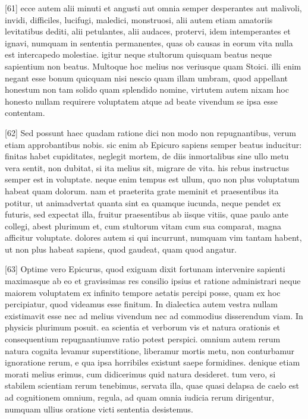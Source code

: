 \documentclass{article}
\begin{document}
[61] ecce autem alii minuti et angusti aut omnia semper desperantes aut malivoli, invidi, difficiles, lucifugi, maledici, monstruosi, alii autem etiam amatoriis levitatibus dediti, alii petulantes, alii audaces, protervi, idem intemperantes et ignavi, numquam in sententia permanentes, quas ob causas in eorum vita nulla est intercapedo molestiae. igitur neque stultorum quisquam beatus neque sapientium non beatus. Multoque hoc melius nos veriusque quam Stoici. illi enim negant esse bonum quicquam nisi nescio quam illam umbram, quod appellant honestum non tam solido quam splendido nomine, virtutem autem nixam hoc honesto nullam requirere voluptatem atque ad beate vivendum se ipsa esse contentam.

[62] Sed possunt haec quadam ratione dici non modo non repugnantibus, verum etiam approbantibus nobis. sic enim ab Epicuro sapiens semper beatus inducitur: finitas habet cupiditates, neglegit mortem, de diis inmortalibus sine ullo metu vera sentit, non dubitat, si ita melius sit, migrare de vita. his rebus instructus semper est in voluptate. neque enim tempus est ullum, quo non plus voluptatum habeat quam dolorum. nam et praeterita grate meminit et praesentibus ita potitur, ut animadvertat quanta sint ea quamque iucunda, neque pendet ex futuris, sed expectat illa, fruitur praesentibus ab iisque vitiis, quae paulo ante collegi, abest plurimum et, cum stultorum vitam cum sua comparat, magna afficitur voluptate. dolores autem si qui incurrunt, numquam vim tantam habent, ut non plus habeat sapiens, quod gaudeat, quam quod angatur.

[63] Optime vero Epicurus, quod exiguam dixit fortunam intervenire sapienti maximasque ab eo et gravissimas res consilio ipsius et ratione administrari neque maiorem voluptatem ex infinito tempore aetatis percipi posse, quam ex hoc percipiatur, quod videamus esse finitum. In dialectica autem vestra nullam existimavit esse nec ad melius vivendum nec ad commodius disserendum viam. In physicis plurimum posuit. ea scientia et verborum vis et natura orationis et consequentium repugnantiumve ratio potest perspici. omnium autem rerum natura cognita levamur superstitione, liberamur mortis metu, non conturbamur ignoratione rerum, e qua ipsa horribiles existunt saepe formidines. denique etiam morati melius erimus, cum didicerimus quid natura desideret. tum vero, si stabilem scientiam rerum tenebimus, servata illa, quae quasi delapsa de caelo est ad cognitionem omnium, regula, ad quam omnia iudicia rerum dirigentur, numquam ullius oratione victi sententia desistemus.
\end{document}

